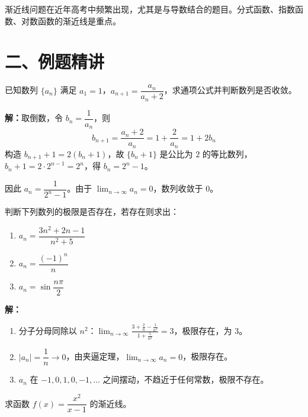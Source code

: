 \documentclass[12pt, a4paper]{ctexart}
\begin{document}
\begin{warnbox}[高考中的渐近线]
渐近线问题在近年高考中频繁出现，尤其是与导数结合的题目。分式函数、指数函数、对数函数的渐近线是重点。
\end{warnbox}

\section*{\textcolor{examorange}{二、例题精讲}}

\begin{examplebox}[【例题1】用极限视角看高考数列题]
已知数列 $\{a_n\}$ 满足 $a_1 = 1$，$a_{n+1} = \dfrac{a_n}{a_n + 2}$，求通项公式并判断数列是否收敛。
\end{examplebox}

\textbf{解：}取倒数，令 $b_n = \dfrac{1}{a_n}$，则
\[
b_{n+1} = \frac{a_n + 2}{a_n} = 1 + \frac{2}{a_n} = 1 + 2b_n
\]
构造 $b_{n+1} + 1 = 2(b_n + 1)$，故 $\{b_n + 1\}$ 是公比为 $2$ 的等比数列，$b_n + 1 = 2 \cdot 2^{n-1} = 2^n$，得 $b_n = 2^n - 1$。

因此 $a_n = \dfrac{1}{2^n - 1}$。由于 $\lim_{n \to \infty} a_n = 0$，数列收敛于 $0$。

\begin{examplebox}[【例题2】判断收敛性]
判断下列数列的极限是否存在，若存在则求出：
\begin{enumerate}[leftmargin=2em]
  \item $a_n = \dfrac{3n^2 + 2n - 1}{n^2 + 5}$
  \item $a_n = \dfrac{(-1)^n}{n}$
  \item $a_n = \sin\dfrac{n\pi}{2}$
\end{enumerate}
\end{examplebox}

\textbf{解：}
\begin{enumerate}[leftmargin=2em]
  \item 分子分母同除以 $n^2$：$\displaystyle\lim_{n \to \infty} \frac{3 + \frac{2}{n} - \frac{1}{n^2}}{1 + \frac{5}{n^2}} = 3$，极限存在，为 $3$。
  \item $|a_n| = \dfrac{1}{n} \to 0$，由夹逼定理，$\lim_{n \to \infty} a_n = 0$，极限存在。
  \item $a_n$ 在 $-1, 0, 1, 0, -1, \ldots$ 之间摆动，不趋近于任何常数，极限不存在。
\end{enumerate}

\begin{examplebox}
求函数 $f(x) = \dfrac{x^2}{x - 1}$ 的渐近线。
\end{examplebox}
\end{document}

